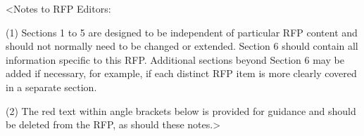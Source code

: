 \begin{itshape}
\color{red}<Notes to RFP Editors:

(1) Sections 1 to 5 are designed to be independent of particular RFP content and should not normally need to be changed or extended. Section 6 should contain all information specific to this RFP. Additional sections beyond Section 6 may be added if necessary, for example, if each distinct RFP item is more clearly covered in a separate section.

(2) The red text within angle brackets below is provided for guidance and should be deleted from the RFP, as should these notes.>
\end{itshape}